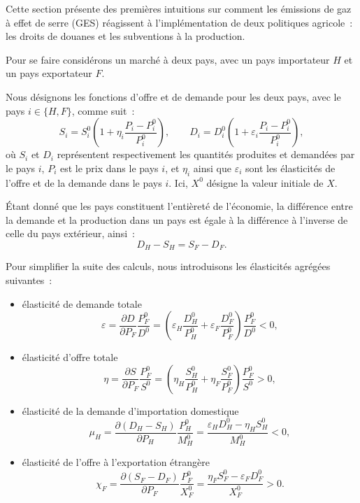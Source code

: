 Cette section présente des premières intuitions sur comment les émissions de gaz à effet de serre (GES) réagissent à l'implémentation de deux politiques agricole~: les droits de douanes et les subventions à la production.

Pour se faire considérons un marché à deux pays, avec un pays importateur $H$ et un pays exportateur $F$.

Nous désignons les fonctions d'offre et de demande pour les deux pays, avec le pays $i \in \{H, F\}$, comme suit~:
$$
    S_i = S_i^0\left(1 + \eta_i\frac{P_i - P_i^0}{P_i^0}\right), \qquad
    D_i = D_i^0\left(1 + \varepsilon_i\frac{P_i - P_i^0}{P_i^0}\right),
$$
où $S_i$ et $D_i$ représentent respectivement les quantités produites et demandées par le pays $i$, $P_i$ est le prix dans le pays $i$, et $\eta_i$ ainsi que $\varepsilon_i$ sont les élasticités de l'offre et de la demande dans le pays $i$. Ici, $X^0$ désigne la valeur initiale de $X$.

Étant donné que les pays constituent l'entièreté de l'économie, la différence entre la demande et la production dans un pays est égale à la différence à l'inverse de celle du pays extérieur, ainsi~:
$$
    D_H - S_H = S_F - D_F.
$$

Pour simplifier la suite des calculs, nous introduisons les élasticités agrégées suivantes~:
\begin{itemize}
    \item élasticité de demande totale
          $$
              \varepsilon = \frac{\partial D}{\partial P_F} \frac{P_F^0}{D^0} = \left( \varepsilon_H \frac{D_H^0}{P_H^0} + \varepsilon_F \frac{D_F^0}{P_F^0} \right)\frac{P_F^0}{D^0} < 0,
          $$
    \item élasticité d'offre totale
          $$
              \eta = \frac{\partial S}{\partial P_F} \frac{P_F^0}{S^0} = \left( \eta_H \frac{S_H^0}{P_H^0} + \eta_F \frac{S_F^0}{P_F^0} \right)\frac{P_F^0}{S^0} > 0,
          $$
    \item élasticité de la demande d'importation domestique
          $$
              \mu_H = \frac{\partial (D_H - S_H)}{\partial P_H} \frac{P_H^0}{M_H^0} = \frac{\varepsilon_H D_H^0 - \eta_H S_H^0}{M_H^0} < 0,
          $$
    \item élasticité de l'offre à l'exportation étrangère
          $$
              \chi_F = \frac{\partial (S_F - D_F)}{\partial P_F} \frac{P_F^0}{X_F^0} = \frac{\eta_F S_F^0 - \varepsilon_F D_F^0}{X_F^0} > 0.
          $$
\end{itemize}

